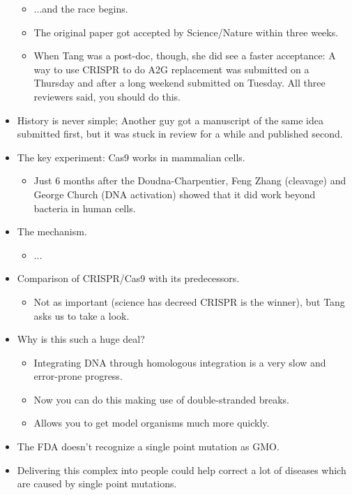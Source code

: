 \documentclass[../notes.tex]{subfiles}
\begin{document}
\begin{itemize}
\begin{itemize}
        \item ...and the race begins.
        \item The original paper got accepted by Science/Nature within three weeks.
        \item When Tang was a post-doc, though, she did see a faster acceptance: A way to use CRISPR to do A2G replacement was submitted on a Thursday and after a long weekend submitted on Tuesday. All three reviewers said, you should do this.
    \end{itemize}
    \item History is never simple; Another guy got a manuscript of the same idea submitted first, but it was stuck in review for a while and published second.
    \item The key experiment: Cas9 works in mammalian cells.
    \begin{itemize}
        \item Just 6 months after the Doudna-Charpentier, Feng Zhang (cleavage) and George Church (DNA activation) showed that it did work beyond bacteria in human cells.
    \end{itemize}
    \item The mechanism.
    \begin{itemize}
        \item ...
    \end{itemize}
    \item Comparison of CRISPR/Cas9 with its predecessors.
    \begin{itemize}
        \item Not as important (science has decreed CRISPR is the winner), but Tang asks us to take a look.
    \end{itemize}
    \item Why is this such a huge deal?
    \begin{itemize}
        \item Integrating DNA through homologous integration is a very slow and error-prone progress.
        \item Now you can do this making use of double-stranded breaks.
        \item Allows you to get model organisms much more quickly.
    \end{itemize}
    \item The FDA doesn't recognize a single point mutation as GMO.
    \item Delivering this complex into people could help correct a lot of diseases which are caused by single point mutations.

\end{itemize}
\end{document}
